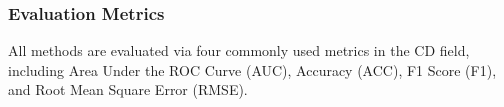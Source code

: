 \documentclass[a4paper,runningheads]{llncs}
\begin{document}
\subsubsection{Evaluation Metrics}
All methods are evaluated via four commonly used metrics in the CD field, including Area Under the ROC Curve (AUC), Accuracy (ACC), F1 Score (F1), and Root Mean Square Error (RMSE).
\end{document}
